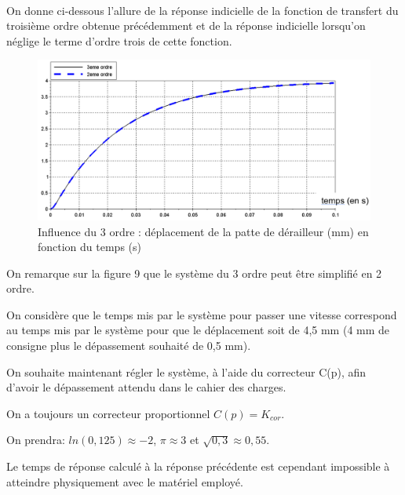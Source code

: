 ~\

On donne ci-dessous l'allure de la réponse indicielle de la fonction de transfert du troisième ordre obtenue précédemment et de la réponse indicielle lorsqu'on néglige le terme d'ordre trois de cette fonction.

\begin{figure}[!h]
 \centering\includegraphics[width=0.8\linewidth]{img/img10}
 \caption{Influence du 3 ordre : déplacement de la patte de dérailleur (mm) en fonction du temps (s)}
 \label{img10}
\end{figure}

On remarque sur la figure 9 que le système du 3 ordre peut être simplifié en 2 ordre. 

On considère que le temps mis par le système pour passer une vitesse correspond au temps mis par le système pour que le déplacement soit de 4,5 mm (4 mm de consigne plus le dépassement souhaité de 0,5 mm).


On souhaite maintenant régler le système, à l'aide du correcteur C(p), afin d'avoir le dépassement attendu dans le cahier des charges.

On a toujours un correcteur proportionnel $C(p)=K_{cor}$.


On prendra: $ln(0,125)\approx -2$, $\pi\approx 3$ et $\sqrt{0,3}\approx 0,55$.

Le temps de réponse calculé à la réponse précédente est cependant impossible à atteindre physiquement avec le matériel employé.

